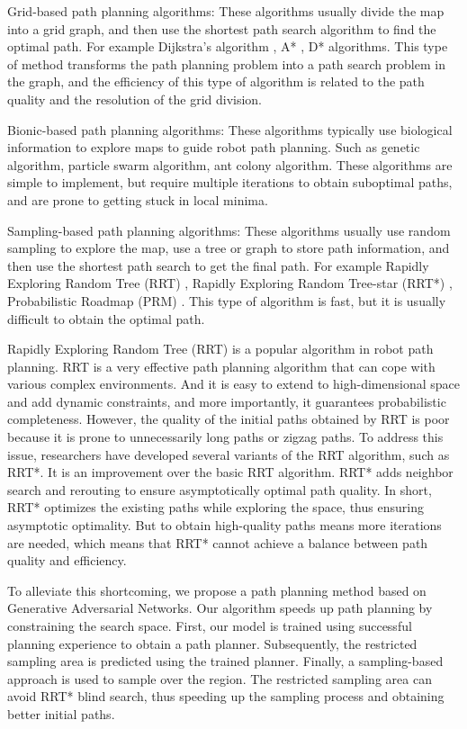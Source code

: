 \documentclass[smallcondensed]{svjour3}     %
\begin{document}
Grid-based path planning algorithms: These algorithms usually divide the map into a grid graph, and then use the shortest path search algorithm to find the optimal path. 
For example Dijkstra's algorithm \cite{dijkstra1959note}, A* \cite{hart1968formal}, D* algorithms. 
This type of method transforms the path planning problem into a path search problem in the graph, and the efficiency of this type of algorithm is related to the path quality and the resolution of the grid division.

Bionic-based path planning algorithms: These algorithms typically use biological information to explore maps to guide robot path planning. 
Such as genetic algorithm, particle swarm algorithm, ant colony algorithm. 
These algorithms are simple to implement, but require multiple iterations to obtain suboptimal paths, and are prone to getting stuck in local minima.

Sampling-based path planning algorithms: These algorithms usually use random sampling to explore the map, use a tree or graph to store path information, and then use the shortest path search to get the final path. 
For example Rapidly Exploring Random Tree (RRT) \cite{lavalle2001rapidly}, Rapidly Exploring Random Tree-star (RRT*) \cite{karaman2011sampling}, Probabilistic Roadmap (PRM) \cite{kuffner2000randomized}. 
This type of algorithm is fast, but it is usually difficult to obtain the optimal path.

Rapidly Exploring Random Tree (RRT) is a popular algorithm in robot path planning. 
RRT is a very effective path planning algorithm that can cope with various complex environments. 
And it is easy to extend to high-dimensional space and add dynamic constraints, and more importantly, it guarantees probabilistic completeness.
However, the quality of the initial paths obtained by RRT is poor because it is prone to unnecessarily long paths or zigzag paths. 
To address this issue, researchers have developed several variants of the RRT algorithm, such as RRT*. 
It is an improvement over the basic RRT algorithm. 
RRT* adds neighbor search and rerouting to ensure asymptotically optimal path quality. 
In short, RRT* optimizes the existing paths while exploring the space, thus ensuring asymptotic optimality. 
But to obtain high-quality paths means more iterations are needed, which means that RRT* cannot achieve a balance between path quality and efficiency.

To alleviate this shortcoming, we propose a path planning method based on Generative Adversarial Networks.
Our algorithm speeds up path planning by constraining the search space. 
First, our model is trained using successful planning experience to obtain a path planner. 
Subsequently, the restricted sampling area is predicted using the trained planner. 
Finally, a sampling-based approach is used to sample over the region. 
The restricted sampling area can avoid RRT* blind search, thus speeding up the sampling process and obtaining better initial paths.
\end{document}
